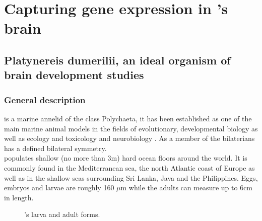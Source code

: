 %
\chapter{Capturing gene expression in \platyfull{}'s brain}\label{ch:background}
%
\section{Platynereis dumerilii, an ideal organism of brain development studies}\label{sec:platynereis}
     \subsection{General description}
     \platyfull{} is a marine annelid of the class Polychaeta, it has been established as one of the main marine animal models in the fields of evolutionary, developmental biology as well as ecology and toxicology and neurobiology \cite{hutchinson95,tessmar03,hardege99,dorresteijn90,fischer04,Fischer10}. As a member of the bilaterians \platy{} has a defined bilateral symmetry.\\
     
     \platy{} populates shallow (no more than 3m) hard ocean floors around the world. It is commonly found in the Mediterranean sea, the north Atlantic coast of Europe as well as in the shallow seas surrounding Sri Lanka, Java and the Philippines. Eggs, embryos and larvae are roughly 160 $\mu$m while the adults can measure up to 6cm in length.
     
     
\begin{figure}[bth]
        \myfloatalign
         \quad
        \caption{\platyfull{}'s larva and adult forms.}\label{fig:platynereis}
\end{figure}
     

